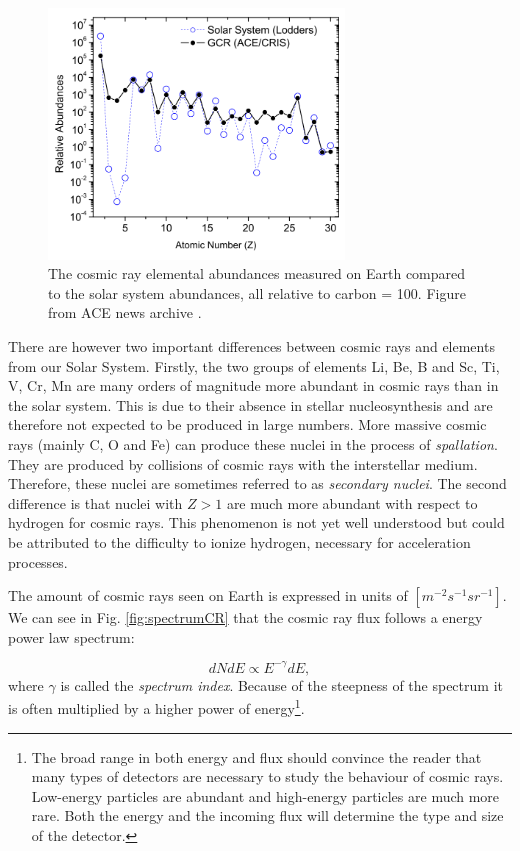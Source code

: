 \begin{figure}
\label{fig:relabundance}
\centering
\includegraphics[width=0.7\textwidth]{./chapter3/img/relativeabundanceACE.png}
\caption{The cosmic ray elemental abundances measured on Earth compared to the solar system abundances, all relative to carbon = 100. Figure from ACE news archive \cite{ISRAEL2005201}.}
\end{figure}
There are however two important differences between cosmic rays and elements from our Solar System. Firstly, the two groups of elements Li, Be, B and Sc, Ti, V, Cr, Mn are many orders of magnitude more abundant in cosmic rays than in the solar system. This is due to their absence in stellar nucleosynthesis and are therefore not expected to be produced in large numbers. More massive cosmic rays (mainly C, O and Fe) can produce these nuclei in the process of \textit{spallation}. They are produced by collisions of cosmic rays with the interstellar medium. Therefore, these nuclei are sometimes referred to as \textit{secondary nuclei}.
The second difference is that nuclei with $Z>1$ are much more abundant with respect to hydrogen for cosmic rays. This phenomenon is not yet well understood but could be attributed to the difficulty to ionize hydrogen, necessary for acceleration processes.

The amount of cosmic rays seen on Earth is expressed in units of $\left[m^{-2} s^{-1} sr^{-1}\right]$. We can see in Fig. \ref{fig:spectrumCR} that the cosmic ray flux follows a energy power law spectrum:

\begin{equation}
dNdE \varpropto E^{-\gamma} dE,
\end{equation} 
where $\gamma$ is called the \textit{spectrum index}. Because of the steepness of the spectrum it is often multiplied by a higher power of energy\footnote{The broad range in both energy and flux should convince the reader that many types of detectors are necessary to study the behaviour of cosmic rays. Low-energy particles are abundant and high-energy particles are much more rare. Both the energy and the incoming flux will determine the type and size of the detector.}.

